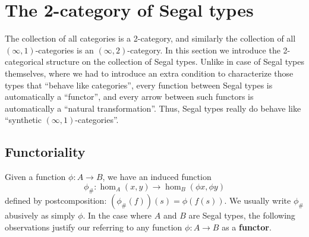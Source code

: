 \documentclass{amsart}
\theoremstyle{plain}
\theoremstyle{definition}
\theoremstyle{remark}
\numberwithin{equation}{section}
\newcommand{\exten}[4]{\left\langle\mathchoice{\textstyle\prod_{#1}}{\textstyle\prod_{#1}}{\scriptstyle\prod_{#1}}{\scriptscriptstyle\prod_{#1}} #2 \middle|^{#3}_{#4}\right\rangle}
\newcommand{\extfn}[1]{{#1}_\#}
\newcommand{\jdeq}{\equiv}
\newcommand{\cb}{\mid}          %
\newcommand{\coftypes}{\mathrel{\mathord{\rangle}\!\!\joinrel\relbar}}
\newcommand{\types}{\vdash}
\newcommand{\subst}[2]{[#1/#2]}
\newcommand{\type}{\;\mathsf{type}}
\begin{document}
\section{The 2-category of Segal types}
\label{sec:2cat-segal}

The collection of all categories is a 2-category, and similarly the collection of all $(\infty,1)$-categories is an $(\infty,2)$-category.
In this section we introduce the 2-categorical structure on the collection of Segal types.
Unlike in case of Segal types themselves, where we had to introduce an extra condition to characterize those types that ``behave like categories'', every function between Segal types is automatically a ``functor'', and every arrow between such functors is automatically a ``natural transformation''.
Thus, Segal types really do behave like ``synthetic $(\infty,1)$-categories''.

\subsection{Functoriality}
\label{sec:functoriality}


Given a function $\phi : A \to B$, we have an induced function
\[ \extfn \phi: \hom_A(x,y) \to \hom_{B}(\phi x, \phi y)\]
defined by postcomposition: $(\extfn \phi(f))(s) = \phi(f(s))$.
We usually write $\extfn \phi$ abusively as simply $\phi$.
In the case where $A$ and $B$ are Segal types, the following observations justify our referring to any function $\phi : A \to B$ as a \textbf{functor}.
\end{document}

